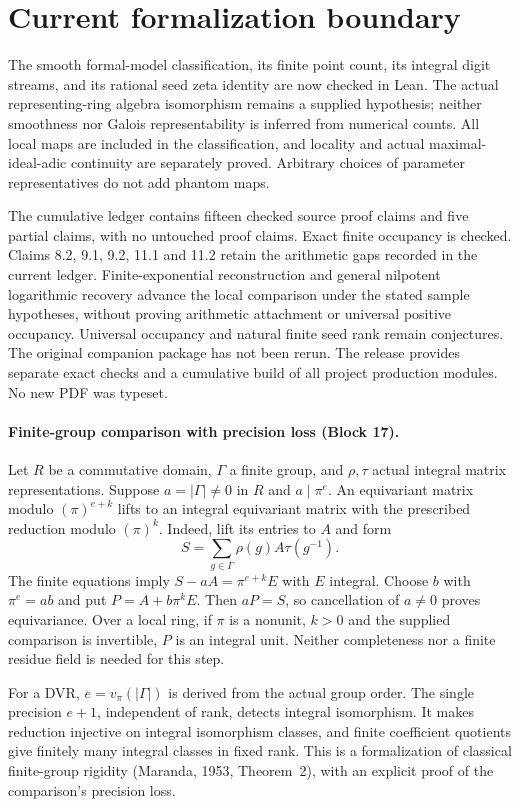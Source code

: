 \documentclass[11pt]{article}
\theoremstyle{definition}
\theoremstyle{remark}
\begin{document}
\section*{Current formalization boundary}
The smooth formal-model classification, its finite point count, its integral digit streams, and its rational seed zeta identity are now checked in Lean. The actual representing-ring algebra isomorphism remains a supplied hypothesis; neither smoothness nor Galois representability is inferred from numerical counts. All local maps are included in the classification, and locality and actual maximal-ideal-adic continuity are separately proved. Arbitrary choices of parameter representatives do not add phantom maps.

The cumulative ledger contains fifteen checked source proof claims and five partial claims, with no untouched proof claims. Exact finite occupancy is checked. Claims 8.2, 9.1, 9.2, 11.1 and 11.2 retain the arithmetic gaps recorded in the current ledger. Finite-exponential reconstruction and general nilpotent logarithmic recovery advance the local comparison under the stated sample hypotheses, without proving arithmetic attachment or universal positive occupancy. Universal occupancy and natural finite seed rank remain conjectures. The original companion package has not been rerun. The release provides separate exact checks and a cumulative build of all project production modules. No new PDF was typeset.


\paragraph{Finite-group comparison with precision loss (Block 17).}
Let $R$ be a commutative domain, $\Gamma$ a finite group, and $\rho,\tau$
actual integral matrix representations. Suppose $a=|\Gamma|\ne0$ in $R$ and
$a\mid\pi^e$. An equivariant matrix modulo $(\pi)^{e+k}$ lifts to an
integral equivariant matrix with the prescribed reduction modulo $(\pi)^k$.
Indeed, lift its entries to $A$ and form
\[
S=\sum_{g\in\Gamma}\rho(g)A\tau(g^{-1}).
\]
The finite equations imply $S-aA=\pi^{e+k}E$ with $E$ integral. Choose $b$
with $\pi^e=ab$ and put $P=A+b\pi^kE$. Then $aP=S$, so cancellation of
$a\ne0$ proves equivariance. Over a local ring, if $\pi$ is a nonunit,
$k>0$ and the supplied comparison is invertible, $P$ is an integral unit.
Neither completeness nor a finite residue field is needed for this step.

For a DVR, $e=v_\pi(|\Gamma|)$ is derived from the actual group order.
The single precision $e+1$, independent of rank, detects integral
isomorphism. It makes reduction injective on integral isomorphism classes,
and finite coefficient quotients give finitely many integral classes in
fixed rank. This is a formalization of classical finite-group rigidity
(Maranda, 1953, Theorem~2), with an explicit proof of the comparison's
precision loss.
\end{document}
